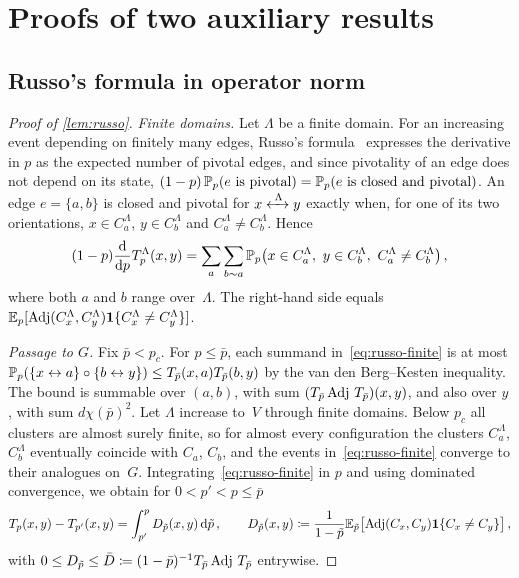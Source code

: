 \section{Proofs of two auxiliary results}\label{app:aux}

\subsection{Russo's formula in operator norm}\label{app:russo}

\begin{proof}[Proof of \cref{lem:russo}]
\emph{Finite domains.} Let $\Lambda$ be a finite domain. For an increasing event depending on finitely
many edges, Russo's formula~\cite[Section~2.4]{Gri99} expresses the derivative in $p$ as the expected
number of pivotal edges, and since pivotality of an edge does not depend on its state,
$(1-p)\,\mathbb P_p(e\text{ is pivotal})=\mathbb P_p(e\text{ is closed and pivotal})$. An edge $e=\{a,b\}$ is closed and
pivotal for $x\xleftrightarrow{\;\Lambda\;}y$ exactly when, for one of its two orientations, $x\in C_a^\Lambda$,
$y\in C_b^\Lambda$ and $C_a^\Lambda\neq C_b^\Lambda$. Hence
\begin{equation}\label{eq:russo-finite}
  (1-p)\frac{\d}{\d p}T_p^\Lambda(x,y)=\sum_{a}\sum_{b\sim a}
  \PP_p\bigl(x\in C_a^\Lambda,\ y\in C_b^\Lambda,\ C_a^\Lambda\neq C_b^\Lambda\bigr)\,,
\end{equation}
where both $a$ and $b$ range over~$\Lambda$. The right-hand side equals
$\mathbb E_p[\operatorname{Adj}(C^\Lambda_x,C^\Lambda_y)\mathbf{1}\{C^\Lambda_x\neq C^\Lambda_y\}]$.

\emph{Passage to $G$.} Fix $\bar p<p_c$. For $p\le \bar p$, each summand in~\eqref{eq:russo-finite} is at most
$\mathbb P_p(\{x\leftrightarrow a\}\circ\{b\leftrightarrow y\})\le T_{\bar p}(x,a)T_{\bar p}(b,y)$ by the van den Berg--Kesten
inequality. The bound is summable over $(a,b)$, with sum $(T_{\bar p}\operatorname{Adj}\,T_{\bar p})(x,y)$, and also over
$y$, with sum $d\chi(\bar p)^2$. Let $\Lambda$ increase to~$V$ through finite domains. Below $p_c$ all
clusters are almost surely finite, so for almost every configuration the clusters $C_a^\Lambda$,
$C_b^\Lambda$ eventually coincide with $C_a$, $C_b$, and the events in~\eqref{eq:russo-finite} converge to their analogues on~$G$.
Integrating~\eqref{eq:russo-finite} in $p$ and using dominated convergence, we obtain for
$0<p'<p\le \bar p$
\begin{equation}\label{eq:russo-integrated}
  T_p(x,y)-T_{p'}(x,y)=\int_{p'}^pD_{\tilde p}(x,y)\,\mathrm{d}\tilde p\,,\qquad
  D_{\tilde p}(x,y)\coloneqq\frac1{1-\tilde p}\mathbb E_{\tilde p}\bigl[\operatorname{Adj}(C_x,C_y)\mathbf{1}\{C_x\neq C_y\}\bigr]\,,
\end{equation}
with $0\le D_{\tilde p}\le\bar D\coloneqq(1-\bar p)^{-1}T_{\bar p}\operatorname{Adj}\,T_{\bar p}$ entrywise.


\end{proof}
